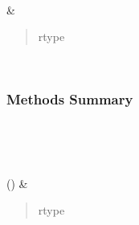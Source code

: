 \documentclass[letterpaper,10pt,english]{sphinxmanual}
\begin{document}
\begin{fulllineitems}
\begin{savenotes}
\begin{longtable}[c]{}
\begin{quote}
\begin{description}
\end{description}\end{quote}

\\
\hline
\sphinxAtStartPar
{\hyperref[\detokenize{api/seyfert.cosmology.weight_functions.LensingWeightFunction:seyfert.cosmology.weight_functions.LensingWeightFunction.c_km_s}]{}}
&
\sphinxAtStartPar
\begin{quote}\begin{description}
\item[{rtype}] \leavevmode
\sphinxAtStartPar
{}

\end{description}\end{quote}

\\
\hline
\end{longtable}\sphinxatlongtableend\end{savenotes}
\subsubsection*{Methods Summary}


\begin{savenotes}\sphinxatlongtablestart\begin{longtable}[c]{}
\hline

\endfirsthead

%
{}\\
\hline

\endhead

\hline
{}\\
\endfoot

\endlastfoot

\sphinxAtStartPar
{\hyperref[\detokenize{api/seyfert.cosmology.weight_functions.LensingWeightFunction:seyfert.cosmology.weight_functions.LensingWeightFunction.computeIntrinsicAlignmentContribution}]{}}()
&
\sphinxAtStartPar
\begin{quote}\begin{description}
\item[{rtype}] \leavevmode
\sphinxAtStartPar
{}


\end{description}
\end{quote}
\end{longtable}
\end{savenotes}
\end{fulllineitems}
\end{document}
